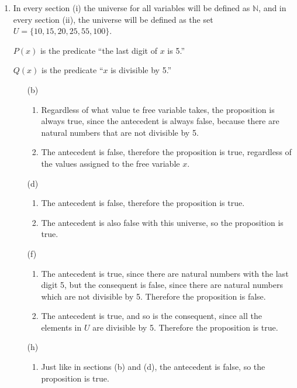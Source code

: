 \documentclass[fleqn]{article}
\begin{document}
\begin{enumerate}
	\item %
	In every section (i) the universe for all variables will be defined as \(\mathbb{N}\), and in every section (ii), the universe will be defined as the set \(U = \{10, 15, 20, 25, 55, 100\}\).

	\(P(x)\) is the predicate ``the last digit of \(x\) is 5.''

	\(Q(x)\) is the predicate ``\(x\) is divisible by 5.''
	\begin{enumerate}
		\item[(b)]
		\begin{enumerate}
			\item %
			Regardless of what value te free variable takes, the proposition is always true, since the antecedent is always false, because there are natural numbers that are not divisible by 5.

			\item %
			The antecedent is false, therefore the proposition is true, regardless of the values assigned to the free variable \(x\).
		\end{enumerate}

		\item[(d)]
		\begin{enumerate}
			\item %
			The antecedent is false, therefore the proposition is true.
			
			\item %
			The antecedent is also false with this universe, so the proposition is true.
		\end{enumerate}

		\item[(f)]
		\begin{enumerate}
			\item %
			The antecedent is true, since there are natural numbers with the last digit 5, but the consequent is false, since there are natural numbers which are not divisible by 5. Therefore the proposition is false.
			
			\item %
			The antecedent is true, and so is the consequent, since all the elements in \(U\) are divisible by 5. Therefore the proposition is true.
		\end{enumerate}

		\item[(h)]
		\begin{enumerate}
			\item %
			Just like in sections (b) and (d), the antecedent is false, so the proposition is true.
			

\end{enumerate}
\end{enumerate}
\end{enumerate}
\end{document}
